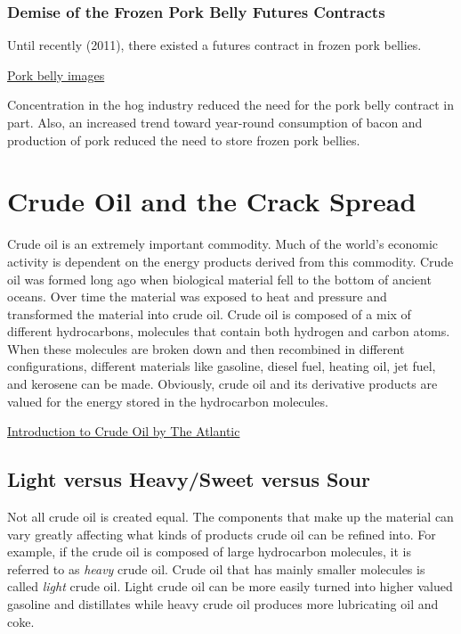 \documentclass[]{book}
\theoremstyle{definition}
\theoremstyle{definition}
\theoremstyle{remark}
\begin{document}
\subsection{Demise of the Frozen Pork Belly Futures
Contracts}\label{demise-of-the-frozen-pork-belly-futures-contracts}

Until recently (2011), there existed a futures contract in frozen pork
bellies.

\href{https://www.google.com/search?q=pork+belly\&biw=1920\&bih=1075\&noj=1\&source=lnms\&tbm=isch\&sa=X\&ved=0CAgQ_AUoAmoVChMIhbO55IqdyQIVDNUeCh0_owNp}{Pork
belly images}

Concentration in the hog industry reduced the need for the pork belly
contract in part. Also, an increased trend toward year-round consumption
of bacon and production of pork reduced the need to store frozen pork
bellies.

\chapter{Crude Oil and the Crack
Spread}\label{crude-oil-and-the-crack-spread}

Crude oil is an extremely important commodity. Much of the world's
economic activity is dependent on the energy products derived from this
commodity. Crude oil was formed long ago when biological material fell
to the bottom of ancient oceans. Over time the material was exposed to
heat and pressure and transformed the material into crude oil. Crude oil
is composed of a mix of different hydrocarbons, molecules that contain
both hydrogen and carbon atoms. When these molecules are broken down and
then recombined in different configurations, different materials like
gasoline, diesel fuel, heating oil, jet fuel, and kerosene can be made.
Obviously, crude oil and its derivative products are valued for the
energy stored in the hydrocarbon molecules.

\href{https://www.youtube.com/watch?v=62LvVYYqUFA}{Introduction to Crude
Oil by The Atlantic}

\section{Light versus Heavy/Sweet versus
Sour}\label{light-versus-heavysweet-versus-sour}

Not all crude oil is created equal. The components that make up the
material can vary greatly affecting what kinds of products crude oil can
be refined into. For example, if the crude oil is composed of large
hydrocarbon molecules, it is referred to as \emph{heavy} crude oil.
Crude oil that has mainly smaller molecules is called \emph{light} crude
oil. Light crude oil can be more easily turned into higher valued
gasoline and distillates while heavy crude oil produces more lubricating
oil and coke.
\end{document}
